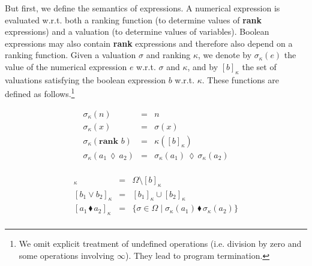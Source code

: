 \documentclass{llncs}
\newcommand{\mods}[2]{[#2]_{#1}}
\newcommand{\areth}{\lozenge}
\newcommand{\comp}{\blacklozenge}
\newcommand{\States}{\Omega}
\begin{document}
But first, we define the semantics of expressions.
A numerical expression is evaluated w.r.t. both a ranking function (to determine values of \textbf{rank} expressions) and a valuation (to determine values of variables).
Boolean expressions may also contain \textbf{rank} expressions and therefore also depend on a ranking function.
Given a valuation $\sigma$ and ranking $\kappa$, we denote by $\sigma_{\kappa}(e)$ the value of the numerical expression $e$ w.r.t. $\sigma$ and $\kappa$,	
	and by $\mods{\kappa}{b}$ the set of valuations satisfying the boolean expression $b$ w.r.t. $\kappa$.
These functions are defined as follows.\footnote{We omit explicit treatment of undefined operations (i.e. division by zero and some operations involving $\infty$). They lead to program termination.}

\noindent\begin{minipage}{.40\columnwidth}
	\begin{eqnarray*}
	\sigma_\kappa(n)	 				&	=	&	n	\\
	\sigma_\kappa(x)	 				&	=	&	\sigma(x)	\\
	\sigma_\kappa(\textbf{rank }b) 			&	=	&	\kappa(\mods{\kappa}{b}) 	\\
	\sigma_\kappa(a_1 \hspace{2pt} \areth \hspace{2pt} a_2) 			&	=	&	\sigma_\kappa(a_1) \hspace{2pt} \areth \hspace{2pt} \sigma_\kappa(a_2) \\
	\end{eqnarray*}
\end{minipage}
\begin{minipage}{.60\columnwidth}
	\begin{eqnarray*}
	\mods{\kappa}{\neg b}				&	=	&	\States \setminus \mods{\kappa}{b}	\\
	\mods{\kappa}{b_1 \vee b_2} 			&	=	&	\mods{\kappa}{b_1} \cup \mods{\kappa}{b_2}	\\
	\mods{\kappa}{a_1 \hspace{2pt} \comp \hspace{2pt} a_2}			&	=	&	\{ \sigma \in \States \mid \sigma_\kappa(a_1) \hspace{2pt} \comp \hspace{2pt} \sigma_\kappa(a_2) \} \\
	\end{eqnarray*}
\end{minipage}
\end{document}
